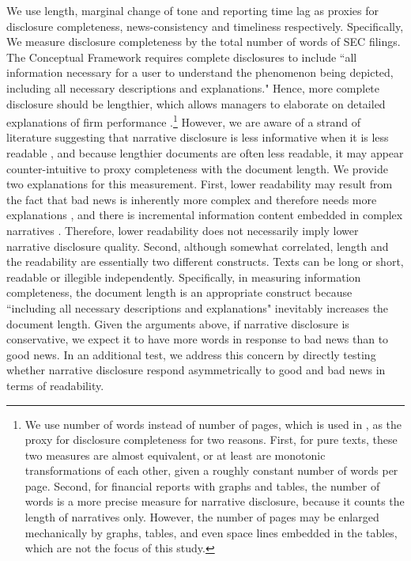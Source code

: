 \documentclass[letterpaper,12pt]{article}
\begin{document}
\begin{spacing}{1.5}
\noindent We use length, marginal change of tone and reporting time lag as proxies for disclosure completeness, news-consistency and timeliness respectively. Specifically, We measure disclosure completeness by the total number of words of SEC filings. The Conceptual Framework requires complete disclosures to include ``all information necessary for a user to understand the phenomenon being depicted, including all necessary descriptions and explanations." \cite[QC12]{fasbConceptualFrameworkFinancial2018} Hence, more complete disclosure should be lengthier, which allows managers to elaborate on detailed explanations of firm performance \cite{leuzDisclosureCostCapital2009}.\footnote{We use number of words instead of number of pages, which is used in , as the proxy for disclosure completeness for two reasons. First, for pure texts, these two measures are almost equivalent, or at least are monotonic transformations of each other, given a roughly constant number of words per page. Second, for financial reports with graphs and tables, the number of words is a more precise measure for narrative disclosure, because it counts the length of narratives only. However, the number of pages may be enlarged mechanically by graphs, tables, and even space lines embedded in the tables, which are not the focus of this study.} However, we are aware of a strand of literature suggesting that narrative disclosure is less informative when it is less readable \cite{liAnnualReportReadability2008, loEarningsManagementAnnual2017, loughranMeasuringReadabilityFinancial2014}, and because lengthier documents are often less readable, it may appear counter-intuitive to proxy completeness with the document length. We provide two explanations for this measurement. First, lower readability may result from the fact that bad news is inherently more complex and therefore needs more explanations \cite{bloomfieldDiscussionAnnualReport2008}, and there is incremental information content embedded in complex narratives \cite{busheeLinguisticComplexityFirm2018}. Therefore, lower readability does not necessarily imply lower narrative disclosure quality. Second, although somewhat correlated, length and the readability are essentially two different constructs. Texts can be long or short, readable or illegible independently. Specifically, in measuring information completeness, the document length is an appropriate construct because ``including all necessary descriptions and explanations" \cite[QC12]{fasbConceptualFrameworkFinancial2018} inevitably increases the document length. Given the arguments above, if narrative disclosure is conservative, we expect it to have more words in response to bad news than to good news. In an additional test, we address this concern by directly testing whether narrative disclosure respond asymmetrically to good and bad news in terms of readability.


\end{spacing}
\end{document}
